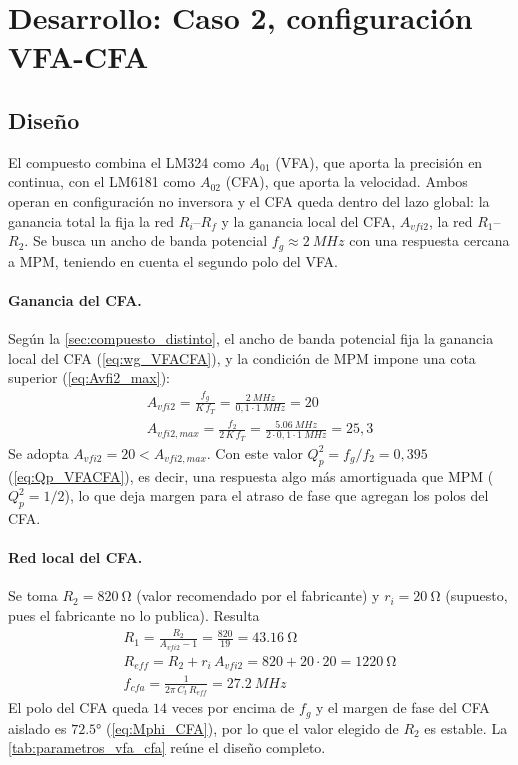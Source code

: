 \section{Desarrollo: Caso 2, configuración VFA-CFA}
\label{sec:desarrollo_c2}

\subsection{Diseño}
\label{sec:diseno_c2}

El compuesto combina el LM324 como $A_{01}$ (VFA), que aporta la precisión en continua, con el LM6181 como $A_{02}$ (CFA), que aporta la velocidad. Ambos operan en configuración no inversora y el CFA queda dentro del lazo global: la ganancia total la fija la red $R_i$--$R_f$ y la ganancia local del CFA, $A_{vfi2}$, la red $R_1$--$R_2$. Se busca un ancho de banda potencial $f_g \approx \SI{2}{MHz}$ con una respuesta cercana a MPM, teniendo en cuenta el segundo polo del VFA.

\paragraph{Ganancia del CFA.} Según la \autoref{sec:compuesto_distinto}, el ancho de banda potencial fija la ganancia local del CFA (\autoref{eq:wg_VFACFA}), y la condición de MPM impone una cota superior (\autoref{eq:Avfi2_max}):
\begin{gather}
    A_{vfi2} = \frac{f_g}{K\,f_T} = \frac{\SI{2}{MHz}}{0{,}1\cdot\SI{1}{MHz}} = 20 \\
    A_{vfi2,max} = \frac{f_2}{2\,K\,f_T} = \frac{\SI{5,06}{MHz}}{2\cdot 0{,}1\cdot\SI{1}{MHz}} = 25{,}3
\end{gather}
Se adopta $A_{vfi2} = 20 < A_{vfi2,max}$. Con este valor $Q_p^2 = f_g/f_2 = 0{,}395$ (\autoref{eq:Qp_VFACFA}), es decir, una respuesta algo más amortiguada que MPM ($Q_p^2 = 1/2$), lo que deja margen para el atraso de fase que agregan los polos del CFA.

\paragraph{Red local del CFA.} Se toma $R_2 = \SI{820}{\ohm}$ (valor recomendado por el fabricante) y $r_i = \SI{20}{\ohm}$ (supuesto, pues el fabricante no lo publica). Resulta
\begin{gather}
    R_1 = \frac{R_2}{A_{vfi2}-1} = \frac{820}{19} = \SI{43,16}{\ohm} \\
    R_{eff} = R_2 + r_i\,A_{vfi2} = 820 + 20\cdot 20 = \SI{1220}{\ohm} \\
    f_{cfa} = \frac{1}{2\pi\,C_t\,R_{eff}} = \SI{27,2}{MHz}
\end{gather}
El polo del CFA queda $14$ veces por encima de $f_g$ y el margen de fase del CFA aislado es $\ang{72,5}$ (\autoref{eq:Mphi_CFA}), por lo que el valor elegido de $R_2$ es estable. La \autoref{tab:parametros_vfa_cfa} reúne el diseño completo.

